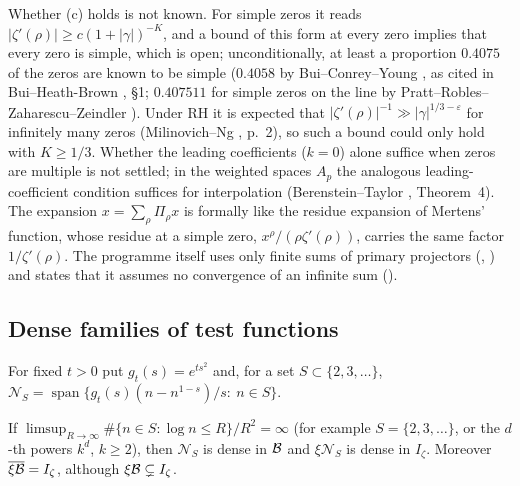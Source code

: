 \begin{remark}\label{rem:primary}
Whether (c) holds is not known. For simple zeros it reads $|\zeta'(\rho)|\ge c(1+|\gamma|)^{-K}$, and a bound of this form at every zero implies that every zero is simple, which is open; unconditionally, at least a proportion $0.4075$ of the zeros are known to be simple ($0.4058$ by Bui--Conrey--Young \cite{BCY}, as cited in Bui--Heath-Brown \cite{BuiHeathBrown}, §1; $0.407511$ for simple zeros on the line by Pratt--Robles--Zaharescu--Zeindler \cite{PRZZ}). Under RH it is expected that $|\zeta'(\rho)|^{-1}\gg|\gamma|^{1/3-\varepsilon}$ for infinitely many zeros (Milinovich--Ng \cite{MilinovichNg}, p.~2), so such a bound could only hold with $K\ge1/3$.
Whether the leading coefficients ($k=0$) alone suffice when zeros are multiple is not settled; in the weighted spaces $A_p$ the analogous leading-coefficient condition suffices for interpolation (Berenstein--Taylor \cite{BerensteinTaylor}, Theorem~4).
The expansion $x=\sum_\rho\Pi_\rho x$ is formally like the residue expansion of Mertens' function, whose residue at a simple zero, $x^\rho/(\rho\zeta'(\rho))$, carries the same factor $1/\zeta'(\rho)$.
The programme itself uses only finite sums of primary projectors (, ) and states that it assumes no convergence of an infinite sum ().
\end{remark}

\subsection{Dense families of test functions}

For fixed $t>0$ put $g_t(s)=e^{ts^2}$ and, for a set $S\subset\{2,3,\dots\}$, $\mathcal{N}_S=\operatorname{span}\{g_t(s)(n-n^{1-s})/s:\ n\in S\}$.

\begin{proposition}\label{prop:NB}
If $\limsup_{R\to\infty}\#\{n\in S:\log n\le R\}/R^2=\infty$ (for example $S=\{2,3,\dots\}$, or the $d$-th powers $k^d$, $k\ge2$), then $\mathcal{N}_S$ is dense in $\mathcal{B}$ and $\xi\mathcal{N}_S$ is dense in $I_\zeta$. Moreover $\overline{\xi\mathcal{B}}=I_\zeta$, although $\xi\mathcal{B}\subsetneq I_\zeta$.
\end{proposition}

